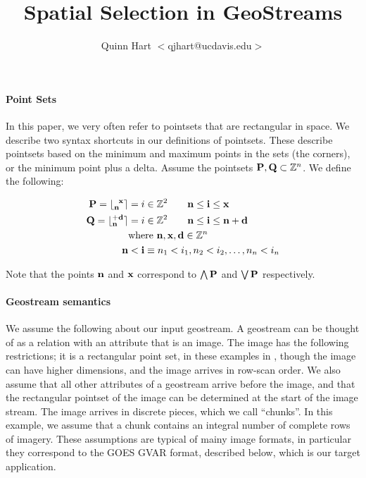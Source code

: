 \documentclass[10pt,letter]{article}
\author{Quinn Hart $<$qjhart@ucdavis.edu$>$}
\title{Spatial Selection in GeoStreams}
\newcommand{\RPSnx}[2]{\lfloor_{\pt{#1}}^{\;\;\pt{#2}}\rceil}
\newcommand{\RPSnd}[2]{\lfloor_{\pt{#1}}^{+\pt{#2}}\rceil}
\begin{document}
\maketitle

\begin{multicols}{2}

\paragraph{Point Sets}

In this paper, we very often refer to pointsets that are rectangular
in space.  We describe two syntax shortcuts in our definitions of
pointsets.  These describe pointsets based on the minimum and maximum
points in the sets (the corners), or the minimum point plus a delta.
Assume the pointsets $\ps{P},\ps{Q} \subset \Z[n]$.  We define the following:

\begin{align*}
\ps{P} = \RPSnx{n}{x} &= {i \in \Z[2] \qquad \pt{n} \le \pt{i} \le \pt{x}}  \\
\ps{Q} = \RPSnd{n}{d} &= {i \in \Z[2] \qquad \pt{n} \le \pt{i} \le \pt{n}+\pt{d}} \\
& \text{where } \pt{n},\pt{x},\pt{d} \in \Z[n] \\
\pt{n} &< \pt{i} \equiv n_1 < i_1, n_2 < i_2, \ldots, n_n < i_n
\end{align*}

Note that the points $\pt{n}$ and $\pt{x}$ correspond to
$\bigwedge{\ps{P}}$ and $\bigvee{\ps{P}}$ respectively.

\paragraph{Geostream semantics}

We assume the following about our input geostream.  A geostream can be
thought of as a relation with an attribute that is an image.  The
image has the following restrictions; it is a rectangular point set,
in these examples in \Zp[2], though the image can have higher
dimensions, and the image arrives in row-scan order.  We also assume
that all other attributes of a geostream arrive before the image, and
that the rectangular pointset of the image can be determined at the
start of the image stream.  The image arrives in discrete pieces,
which we call ``chunks''.  In this example, we assume that a chunk
contains an integral number of complete rows of imagery.  These
assumptions are typical of mainy image formats, in particular they
correspond to the GOES GVAR format, described below, which is our
target application.


\end{multicols}
\end{document}
